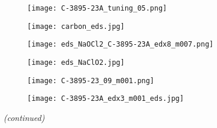 \begin{figure}[htbp]
\ContinuedFloat
    \centering
    \begin{subfigure}[t]{\textwidth}
        \caption{}\label{fig:subBa_particle_carbon}
          \begin{minipage}[t]{0.43\linewidth}
            \centering
            \texttt{[image: C-3895-23A\_tuning\_05.png]}%
          \end{minipage}
          \hfill
          \begin{minipage}[t]{0.43\linewidth}
            \centering
            \texttt{[image: carbon\_eds.jpg]}
          \end{minipage}
          \begin{minipage}[t]{0.11\linewidth}
            \centering
            \atomicTable[&][&][&]
          \end{minipage}
    \end{subfigure}%
    \par\bigskip
    \begin{subfigure}[t]{\textwidth}
    \caption{}\label{fig:EDS_NaClO}
          \begin{minipage}[t]{0.43\linewidth}
            \centering
            \texttt{[image: eds\_NaOCl2\_C-3895-23A\_edx8\_m007.png]}
          \end{minipage}
          \hfill
          \begin{minipage}[t]{0.43\linewidth}
            \centering
            \texttt{[image: eds\_NaClO2.jpg]}
          \end{minipage}
          \begin{minipage}[t]{0.11\linewidth}
            \centering
            \atomicTable[&][&][&]
          \end{minipage}
    \end{subfigure}%
    \par\bigskip
    \begin{subfigure}[t]{\textwidth}
        \caption{}\label{fig:SEM_C389523_void_eds}
          \begin{minipage}[t]{0.43\linewidth}

            \centering
            \texttt{[image: C-3895-23\_09\_m001.png]}%
          \end{minipage}
          \hfill
          \begin{minipage}[t]{0.43\linewidth}
            \centering
            \texttt{[image: C-3895-23A\_edx3\_m001\_eds.jpg]}
          \end{minipage}
          \begin{minipage}[t]{0.11\linewidth}
            \centering
            \atomicTable[&][&][&]
          \end{minipage}
    \end{subfigure}%
    \captionsetup{list=no}
    \caption{\emph{(continued)}}
\end{figure}
